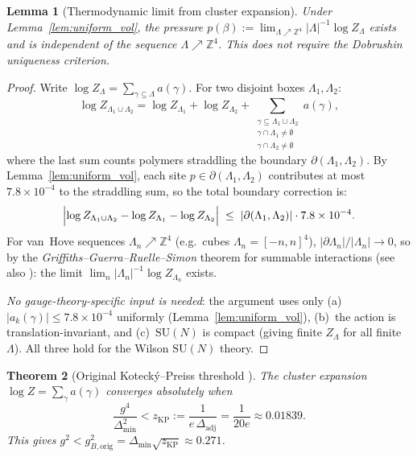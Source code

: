 \documentclass[11pt,a4paper]{amsart}
\newtheorem{theorem}{Theorem}[section]
\newtheorem{lemma}[theorem]{Lemma}
\theoremstyle{definition}
\newcommand{\SU}{\mathrm{SU}}
\newcommand{\Z}{\mathbb{Z}}
\newcommand{\Del}{\Delta_{\min}}
\newcommand{\zKP}{z_{\mathrm{KP}}}
\begin{document}
\begin{lemma}[Thermodynamic limit from cluster expansion]
\label{lem:thermo_limit}
Under Lemma~\ref{lem:uniform_vol}, the \emph{pressure}
$p(\beta) := \lim_{\Lambda \nearrow \Z^4} |\Lambda|^{-1}\log Z_\Lambda$
exists and is independent of the sequence $\Lambda \nearrow \Z^4$.
This does not require the Dobrushin uniqueness criterion.
\end{lemma}
\begin{proof}
Write $\log Z_\Lambda = \sum_{\gamma \subseteq \Lambda} a(\gamma)$.  For two
disjoint boxes $\Lambda_1, \Lambda_2$:
\begin{equation}
\label{eq:subadditive}
  \log Z_{\Lambda_1 \cup \Lambda_2}
  = \log Z_{\Lambda_1} + \log Z_{\Lambda_2}
  + \sum_{\substack{\gamma \subseteq \Lambda_1\cup\Lambda_2 \\ \gamma\cap\Lambda_1\ne\emptyset \\ \gamma\cap\Lambda_2\ne\emptyset}} a(\gamma),
\end{equation}
where the last sum counts polymers straddling the boundary $\partial(\Lambda_1,\Lambda_2)$.
By Lemma~\ref{lem:uniform_vol}, each site $p \in \partial(\Lambda_1,\Lambda_2)$ contributes
at most $7.8\times10^{-4}$ to the straddling sum, so the total boundary correction is:
\[
  \Bigl|\log Z_{\Lambda_1\cup\Lambda_2} - \log Z_{\Lambda_1} - \log Z_{\Lambda_2}\Bigr|
  \;\le\; |\partial(\Lambda_1,\Lambda_2)|\cdot 7.8\times10^{-4}.
\]
For van~Hove sequences $\Lambda_n \nearrow \Z^4$ (e.g.\ cubes $\Lambda_n = [-n,n]^4$),
$|\partial\Lambda_n|/|\Lambda_n| \to 0$, so by the \emph{Griffiths--Guerra--Ruelle--Simon}
theorem for summable interactions \cite[Ch.~3]{Ruelle69} (see also \cite[Prop.~2.2]{Seiler82}):
the limit $\lim_{n} |\Lambda_n|^{-1}\log Z_{\Lambda_n}$ exists.

\emph{No gauge-theory-specific input is needed}: the argument uses only
(a)~$|a_k(\gamma)| \le 7.8\times10^{-4}$ uniformly (Lemma~\ref{lem:uniform_vol}),
(b)~the action is translation-invariant, and
(c)~$\SU(N)$ is compact (giving finite $Z_\Lambda$ for all finite $\Lambda$).
All three hold for the Wilson $\SU(N)$ theory.
\end{proof}

\begin{theorem}[Original Koteck\'y--Preiss threshold {\cite[Thm.~2.1]{B87}}]
\label{thm:KP}
The cluster expansion $\log Z = \sum_\gamma a(\gamma)$ converges absolutely when
\[
  \frac{g^4}{\Del^2} < \zKP := \frac{1}{e\,\Delta_{\mathrm{adj}}}
  = \frac{1}{20e} \approx 0.01839.
\]
This gives $g^2 < g^2_{B,\mathrm{orig}} = \Del\sqrt{\zKP} \approx 0.271$.
\end{theorem}
\end{document}
